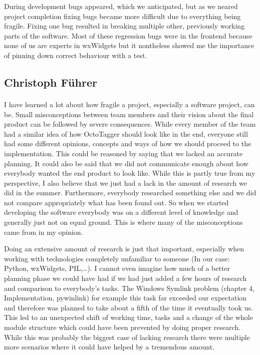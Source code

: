 During development bugs appeared, which we anticipated, but as we neared
project completion fixing bugs became more difficult due to everything being
fragile. Fixing one bug resulted in breaking multiple other, previously working
parts of the software. Most of these regression bugs were in the frontend
because none of us are experts in wxWidgets but it nontheless showed me the
importance of pinning down correct behaviour with a test.

\subsection{Christoph Führer}

\paragraph{}
I have learned a lot about how fragile a project, especially a software project, can be. Small misconceptions between team members and their vision about the final product can be followed by severe consequences. While every member of the team had a similar idea of how OctoTagger should look like in the end, everyone still had some different opinions, concepts and ways of how we should proceed to the implementation. This could be reasoned by saying that we lacked an accurate planning. It could also be said that we did not communicate enough about how everybody wanted the end product to look like. While this is partly true from my perspective, I also believe that we just had a lack in the amount of research we did in the summer. Furthermore, everybody researched something else and we did not compare appropriately what has been found out. So when we started developing the software everybody was on a different level of knowledge and generally just not on equal ground. This is where many of the misconceptions came from in my opinion.  

Doing an extensive amount of research is just that important, especially when working with technologies completely unfamiliar to someone (In our case: Python, wxWidgets, PIL,\ldots). I cannot even imagine how much of a better planning phase we could have had if we had just added a few hours of research and comparison to everybody's tasks. The Windows Symlink problem (chapter 4, Implementation, pywinlink) for example this task far exceeded our expectation and therefore was planned to take about a fifth of the time it eventually took us. This led to an unexpected shift of working time, tasks and a change of the whole module structure which could have been prevented by doing proper research. While this was probably the biggest case of lacking research there were multiple more scenarios where it could have helped by a tremendous amount.

